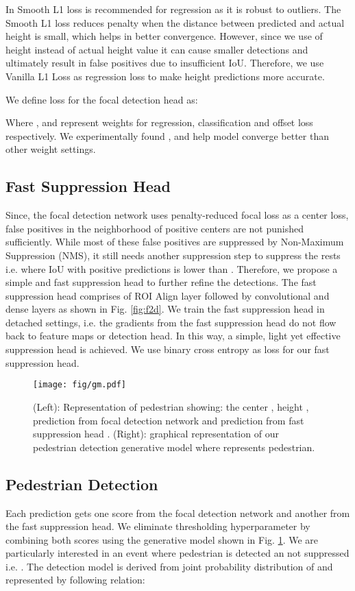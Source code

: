 \documentclass[a4paper,conference]{IEEEtran}
\begin{document}
In \cite{fastrcnn} Smooth L1 loss is recommended for regression as it is robust to outliers. The Smooth L1 loss reduces penalty when the distance between predicted and actual height is small, which helps in better convergence. However, since we use  of height instead of actual height value it can cause smaller detections and ultimately result in false positives due to insufficient IoU. Therefore, we use Vanilla L1 Loss as regression loss to make height predictions more accurate.

We define loss for the focal detection head as:



Where ,  and  represent weights for regression, classification and offset loss respectively. We experimentally found ,  and  help model converge better than other weight settings.

\subsection{Fast Suppression Head}
Since, the focal detection network uses penalty-reduced focal loss as a center loss, false positives in the neighborhood of positive centers are not punished sufficiently. While most of these false positives are suppressed by Non-Maximum Suppression (NMS), it still needs another suppression step to suppress the rests i.e. where IoU with positive predictions is lower than . Therefore, we propose a simple and fast suppression head to further refine the detections. The fast suppression head comprises of ROI Align layer followed by convolutional and dense layers as shown in Fig. \ref{fig:f2d}. We train the fast suppression head in detached settings, i.e. the gradients from the fast suppression head do not flow back to feature maps or detection head. In this way, a simple, light yet effective suppression head is achieved. We use binary cross entropy as loss for our fast suppression head.

\begin{figure}
    \centering
    \texttt{[image: fig/gm.pdf]}
    \caption{(Left): Representation of pedestrian showing: the center , height , prediction from focal detection network  and prediction from fast suppression head . (Right): graphical representation of our pedestrian detection generative model where  represents pedestrian.}
    \label{fig:generative_model}
\end{figure}

\subsection{Pedestrian Detection}
Each prediction gets one score from the focal detection network and another from the fast suppression head. We eliminate thresholding hyperparameter by combining both scores using the generative model shown in Fig. \ref{fig:generative_model}. We are particularly interested in an event where pedestrian is detected an not suppressed i.e. . The detection model is derived from joint probability distribution of  and represented by following relation:
\end{document}
